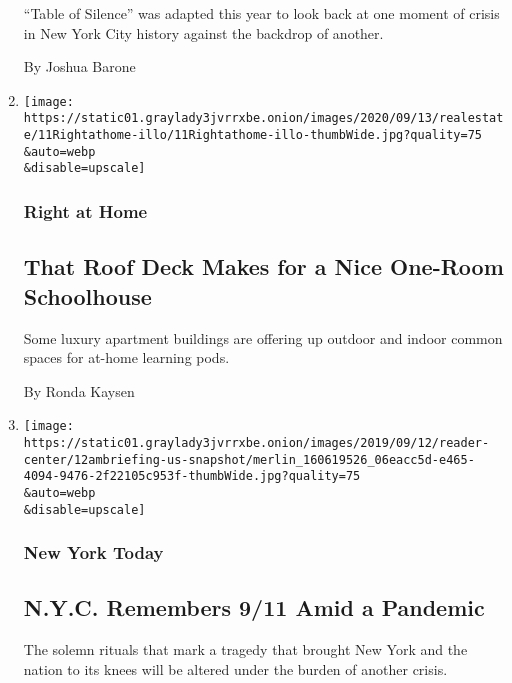 \begin{enumerate}
  ``Table of Silence'' was adapted this year to look back at one moment
  of crisis in New York City history against the backdrop of another.

  By Joshua Barone
\item
  \href{/2020/09/11/realestate/school-at-home.html}{}

  \texttt{[image: https://static01.graylady3jvrrxbe.onion/images/2020/09/13/realestate/11Rightathome-illo/11Rightathome-illo-thumbWide.jpg?quality=75\\\&auto=webp\\\&disable=upscale]}

  \hypertarget{right-at-home}{%
  \subsubsection{Right at Home}\label{right-at-home}}

  \hypertarget{that-roof-deck-makes-for-a-nice-one-room-schoolhouse}{%
  \subsection{That Roof Deck Makes for a Nice One-Room
  Schoolhouse}\label{that-roof-deck-makes-for-a-nice-one-room-schoolhouse}}

  Some luxury apartment buildings are offering up outdoor and indoor
  common spaces for at-home learning pods.

  By Ronda Kaysen
\item
  \href{/2020/09/11/nyregion/nyc-sept-11-coronavirus.html}{}

  \texttt{[image: https://static01.graylady3jvrrxbe.onion/images/2019/09/12/reader-center/12ambriefing-us-snapshot/merlin\_160619526\_06eacc5d-e465-4094-9476-2f22105c953f-thumbWide.jpg?quality=75\\\&auto=webp\\\&disable=upscale]}

  \hypertarget{new-york-today}{%
  \subsubsection{New York Today}\label{new-york-today}}

  \hypertarget{nyc-remembers-911-amid-a-pandemic}{%
  \subsection{N.Y.C. Remembers 9/11 Amid a
  Pandemic}\label{nyc-remembers-911-amid-a-pandemic}}

  The solemn rituals that mark a tragedy that brought New York and the
  nation to its knees will be altered under the burden of another
  crisis.


\end{enumerate}
